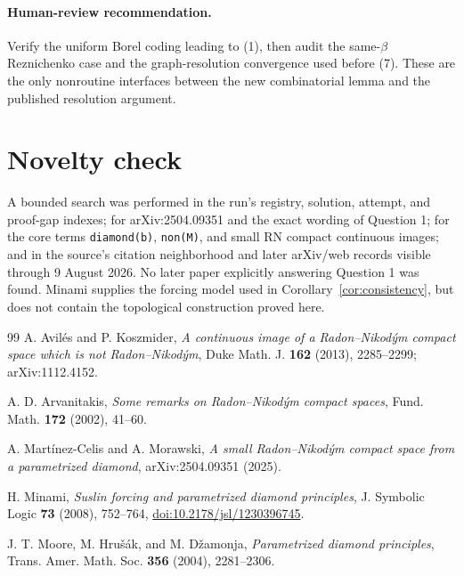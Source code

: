 \documentclass[11pt]{article}
\begin{document}
\paragraph{Human-review recommendation.}
Verify the uniform Borel coding leading to (1), then audit the same-$\beta$
Reznichenko case and the graph-resolution convergence used before (7).  These
are the only nonroutine interfaces between the new combinatorial lemma and the
published resolution argument.

\section{Novelty check}

A bounded search was performed in the run's registry, solution, attempt, and
proof-gap indexes; for arXiv:2504.09351 and the exact wording of Question 1;
for the core terms \texttt{diamond(b)}, \texttt{non(M)}, and small RN compact
continuous images; and in the source's citation neighborhood and later
arXiv/web records visible through 9 August 2026.  No later paper explicitly
answering Question 1 was found.  Minami \cite{Minami} supplies the forcing
model used in Corollary~\ref{cor:consistency}, but does not contain the
topological construction proved here.

\begin{thebibliography}{99}
A. Avil\'es and P. Koszmider,
\emph{A continuous image of a Radon--Nikod\'ym compact space which is not
Radon--Nikod\'ym}, Duke Math. J. \textbf{162} (2013), 2285--2299;
arXiv:1112.4152.

A. D. Arvanitakis,
\emph{Some remarks on Radon--Nikod\'ym compact spaces},
Fund. Math. \textbf{172} (2002), 41--60.

A. Mart\'inez-Celis and A. Morawski,
\emph{A small Radon--Nikod\'ym compact space from a parametrized diamond},
arXiv:2504.09351 (2025).

H. Minami,
\emph{Suslin forcing and parametrized diamond principles},
J. Symbolic Logic \textbf{73} (2008), 752--764,
\href{https://doi.org/10.2178/jsl/1230396745}{doi:10.2178/jsl/1230396745}.

J. T. Moore, M. Hru\v{s}\'ak, and M. D\v{z}amonja,
\emph{Parametrized diamond principles},
Trans. Amer. Math. Soc. \textbf{356} (2004), 2281--2306.
\end{thebibliography}
\end{document}

